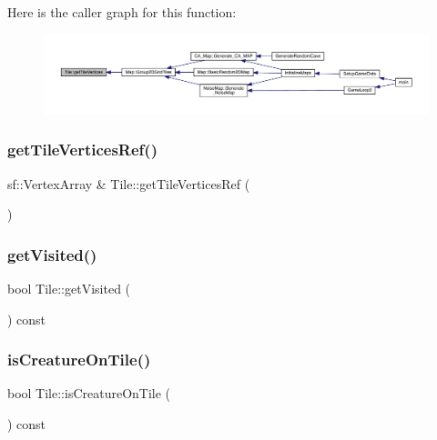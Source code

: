 Here is the caller graph for this function\+:
\nopagebreak
\begin{figure}[H]
\begin{center}
\leavevmode
\includegraphics[width=350pt]{class_tile_ab3414f28d4e7334903bc9e8f8451ccee_icgraph}
\end{center}
\end{figure}
\mbox{\label{class_tile_a809331f7f2702ca0e0473446b7e37b06}} 
\subsubsection{\texorpdfstring{get\+Tile\+Vertices\+Ref()}{getTileVerticesRef()}}
{\footnotesize\ttfamily sf\+::\+Vertex\+Array \& Tile\+::get\+Tile\+Vertices\+Ref (\begin{DoxyParamCaption}{ }\end{DoxyParamCaption})}

\mbox{\label{class_tile_aa062f5d016739f13f9239341acb75e73}} 
\subsubsection{\texorpdfstring{get\+Visited()}{getVisited()}}
{\footnotesize\ttfamily bool Tile\+::get\+Visited (\begin{DoxyParamCaption}{ }\end{DoxyParamCaption}) const}

\mbox{\label{class_tile_a450d291bd9711aa77373d56c37cea05a}} 
\subsubsection{\texorpdfstring{is\+Creature\+On\+Tile()}{isCreatureOnTile()}}
{\footnotesize\ttfamily bool Tile\+::is\+Creature\+On\+Tile (\begin{DoxyParamCaption}{ }\end{DoxyParamCaption}) const}

